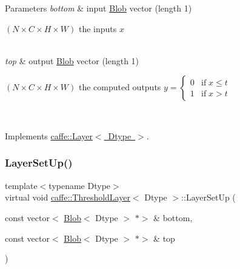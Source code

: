 \begin{DoxyParams}{Parameters}
{\em bottom} & input \mbox{\hyperlink{classcaffe_1_1_blob}{Blob}} vector (length 1)
\begin{DoxyEnumerate}
\item $ (N \times C \times H \times W) $ the inputs $ x $ 
\end{DoxyEnumerate}\\
\hline
{\em top} & output \mbox{\hyperlink{classcaffe_1_1_blob}{Blob}} vector (length 1)
\begin{DoxyEnumerate}
\item $ (N \times C \times H \times W) $ the computed outputs $ y = \left\{ \begin{array}{lr} 0 & \mathrm{if} \; x \le t \\ 1 & \mathrm{if} \; x > t \end{array} \right. $ 
\end{DoxyEnumerate}\\
\hline
\end{DoxyParams}


Implements \mbox{\hyperlink{classcaffe_1_1_layer_a576ac6a60b1e99fe383831f52a6cea77}{caffe\+::\+Layer$<$ Dtype $>$}}.

\mbox{\label{classcaffe_1_1_threshold_layer_a4902e90735cf20735343705014b4176f}} 
\subsubsection{\texorpdfstring{Layer\+Set\+Up()}{LayerSetUp()}\hspace{0.1cm}{\footnotesize\ttfamily [1/2]}}
{\footnotesize\ttfamily template$<$typename Dtype$>$ \\
virtual void \mbox{\hyperlink{classcaffe_1_1_threshold_layer}{caffe\+::\+Threshold\+Layer}}$<$ Dtype $>$\+::Layer\+Set\+Up (\begin{DoxyParamCaption}\item[{const vector$<$ \mbox{\hyperlink{classcaffe_1_1_blob}{Blob}}$<$ Dtype $>$ $\ast$$>$ \&}]{bottom,  }\item[{const vector$<$ \mbox{\hyperlink{classcaffe_1_1_blob}{Blob}}$<$ Dtype $>$ $\ast$$>$ \&}]{top }\end{DoxyParamCaption})\hspace{0.3cm}{\ttfamily [virtual]}}



